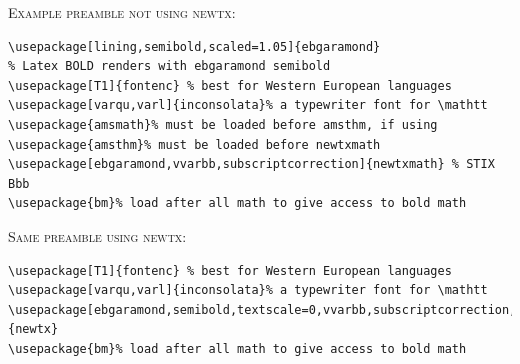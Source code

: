 \documentclass[\fsc]{article}
\theoremstyle{oldplain}
\theoremstyle{plain}
\begin{document}
\textsc{Example preamble not using newtx:}
\begin{verbatim}
\usepackage[lining,semibold,scaled=1.05]{ebgaramond} 
% Latex BOLD renders with ebgaramond semibold 
\usepackage[T1]{fontenc} % best for Western European languages
\usepackage[varqu,varl]{inconsolata}% a typewriter font for \mathtt
\usepackage{amsmath}% must be loaded before amsthm, if using
\usepackage{amsthm}% must be loaded before newtxmath
\usepackage[ebgaramond,vvarbb,subscriptcorrection]{newtxmath} % STIX Bbb
\usepackage{bm}% load after all math to give access to bold math
\end{verbatim}
\textsc{Same preamble using newtx:}
\begin{verbatim}
\usepackage[T1]{fontenc} % best for Western European languages
\usepackage[varqu,varl]{inconsolata}% a typewriter font for \mathtt
\usepackage[ebgaramond,semibold,textscale=0,vvarbb,subscriptcorrection,amsthm]{newtx}
\usepackage{bm}% load after all math to give access to bold math
\end{verbatim}
\end{document}
